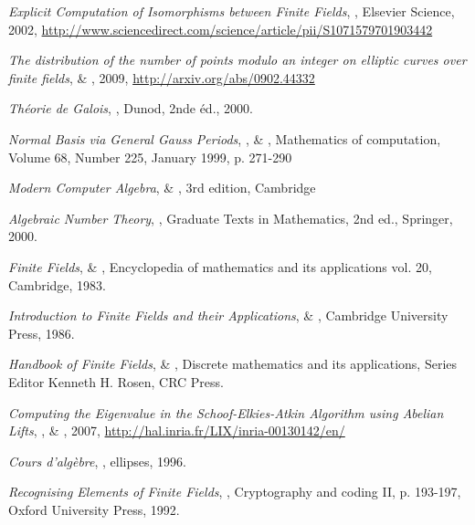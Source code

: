 \documentclass[a4paper]{article} %
\numberwithin{section}{part}
\numberwithin{equation}{section}
\begin{document}
\begin{thebibliography}{LC}

 \emph{Explicit Computation of Isomorphisms between Finite
Fields}, , Elsevier Science, 2002, 
\url{http://www.sciencedirect.com/science/article/pii/S1071579701903442}

 \emph{The distribution of the number of points modulo an
integer on elliptic curves over finite fields},  \&
, 2009, \url{http://arxiv.org/abs/0902.44332} 

 \emph{Théorie de Galois}, , Dunod, 2nde
éd., 2000.

 \emph{Normal Basis \textup{via} General Gauss Periods},
,  \& , 
Mathematics of computation, Volume 68, Number 225, January 1999, p. 271-290

 \emph{Modern Computer Algebra},  \&
, 3rd edition, Cambridge

 \emph{Algebraic Number Theory}, , Graduate Texts
in Mathematics, 2nd ed., Springer, 2000.

 \emph{Finite Fields},  \& 
, Encyclopedia of mathematics and its applications vol.
20, Cambridge, 1983.

 \emph{Introduction to Finite Fields and their Applications},
 \& , Cambridge University Press,
1986.

 \emph{Handbook of Finite Fields},  \& 
, Discrete mathematics and its applications, Series Editor 
Kenneth H. Rosen, CRC Press.

 \emph{Computing the Eigenvalue in the Schoof-Elkies-Atkin
Algorithm using Abelian Lifts}, ,  \&
, 2007, 
\url{http://hal.inria.fr/LIX/inria-00130142/en/}

 \emph{Cours d'algèbre}, , ellipses, 1996.

 \emph{Recognising Elements of Finite Fields}, , Cryptography and coding II, p. 193-197, Oxford University Press, 1992.


\end{thebibliography}
\end{document}
